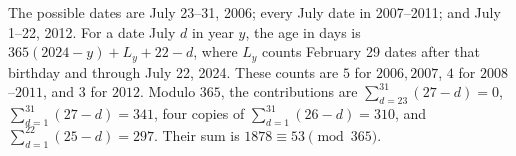 The possible dates are July 23--31, 2006; every July date in 2007--2011; and July 1--22, 2012. For a date July $d$ in year $y$, the age in days is $365(2024-y)+L_y+22-d$, where $L_y$ counts February 29 dates after that birthday and through July 22, 2024. These counts are $5$ for $2006,2007$, $4$ for $2008$--$2011$, and $3$ for $2012$. Modulo $365$, the contributions are $\sum_{d=23}^{31}(27-d)=0$, $\sum_{d=1}^{31}(27-d)=341$, four copies of $\sum_{d=1}^{31}(26-d)=310$, and $\sum_{d=1}^{22}(25-d)=297$. Their sum is $1878\equiv\boxed{53}\pmod{365}$.

